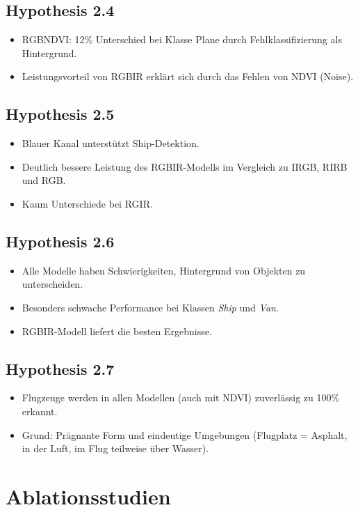 \subsection*{Hypothesis 2.4}
\begin{itemize}
  \item RGBNDVI: 12\% Unterschied bei Klasse Plane durch Fehlklassifizierung als Hintergrund.
  \item Leistungsvorteil von RGBIR erklärt sich durch das Fehlen von NDVI (Noise).
\end{itemize}

\subsection*{Hypothesis 2.5}
\begin{itemize}
  \item Blauer Kanal unterstützt Ship-Detektion.
  \item Deutlich bessere Leistung des RGBIR-Modells im Vergleich zu IRGB, RIRB und RGB.
  \item Kaum Unterschiede bei RGIR.
\end{itemize}

\subsection*{Hypothesis 2.6}
\begin{itemize}
  \item Alle Modelle haben Schwierigkeiten, Hintergrund von Objekten zu unterscheiden.
  \item Besonders schwache Performance bei Klassen \emph{Ship} und \emph{Van}.
  \item RGBIR-Modell liefert die besten Ergebnisse.
\end{itemize}

\subsection*{Hypothesis 2.7}
\begin{itemize}
  \item Flugzeuge werden in allen Modellen (auch mit NDVI) zuverlässig zu 100\% erkannt.
  \item Grund: Prägnante Form und eindeutige Umgebungen (Flugplatz = Asphalt, in der Luft, im Flug teilweise über Wasser).
\end{itemize}


\section{Ablationsstudien}

